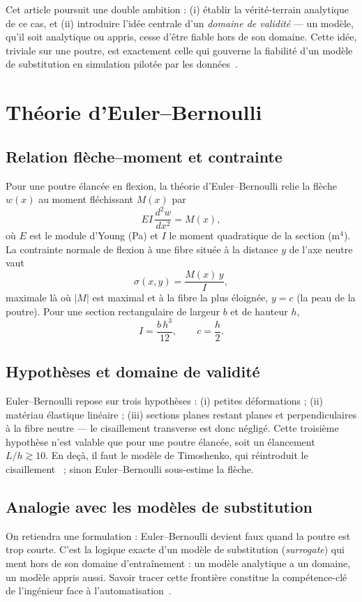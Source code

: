 \documentclass[10pt,journal]{IEEEtran}
\begin{document}
Cet article poursuit une double ambition : (i) établir la vérité-terrain analytique de ce cas, et (ii) introduire l'idée centrale d'un \emph{domaine de validité} --- un modèle, qu'il soit analytique ou appris, cesse d'être fiable hors de son domaine. Cette idée, triviale sur une poutre, est exactement celle qui gouverne la fiabilité d'un modèle de substitution en simulation pilotée par les données~\cite{forrester}.

\section{Théorie d'Euler--Bernoulli}
\subsection{Relation flèche--moment et contrainte}
Pour une poutre élancée en flexion, la théorie d'Euler--Bernoulli relie la flèche $w(x)$ au moment fléchissant $M(x)$ par~\cite{gere}
\begin{equation}
EI\,\frac{d^2 w}{dx^2} = M(x),
\end{equation}
où $E$ est le module d'Young (Pa) et $I$ le moment quadratique de la section (m$^4$). La contrainte normale de flexion à une fibre située à la distance $y$ de l'axe neutre vaut
\begin{equation}
\sigma(x,y) = \frac{M(x)\,y}{I},
\end{equation}
maximale là où $|M|$ est maximal et à la fibre la plus éloignée, $y=c$ (la \og peau\fg{} de la poutre). Pour une section rectangulaire de largeur $b$ et de hauteur $h$,
\begin{equation}
I = \frac{b\,h^3}{12}, \qquad c = \frac{h}{2}.
\end{equation}

\subsection{Hypothèses et domaine de validité}
Euler--Bernoulli repose sur trois hypothèses : (i) petites déformations ; (ii) matériau élastique linéaire ; (iii) sections planes restant planes et perpendiculaires à la fibre neutre --- le cisaillement transverse est donc négligé. Cette troisième hypothèse n'est valable que pour une poutre élancée, soit un élancement $L/h \gtrsim 10$. En deçà, il faut le modèle de Timoshenko, qui réintroduit le cisaillement~\cite{timoshenko_shear} ; sinon Euler--Bernoulli sous-estime la flèche.

\subsection{Analogie avec les modèles de substitution}
On retiendra une formulation : \og Euler--Bernoulli devient faux quand la poutre est trop courte.\fg{} C'est la logique exacte d'un modèle de substitution (\emph{surrogate}) qui ment hors de son domaine d'entraînement : un modèle analytique a un domaine, un modèle appris aussi. Savoir tracer cette frontière constitue la compétence-clé de l'ingénieur face à l'automatisation~\cite{forrester}.
\end{document}
